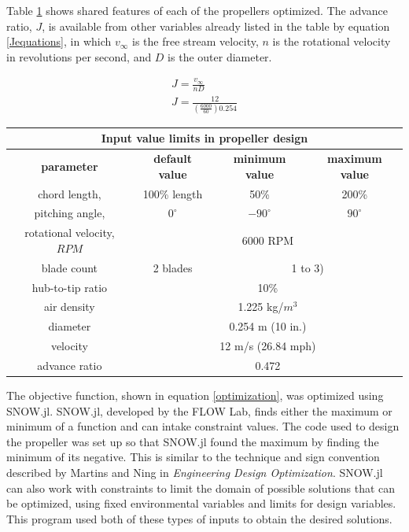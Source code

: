 \documentclass[journal ]{new-aiaa}
\begin{document}
Table \ref{constraintstab} shows shared features of each of the propellers optimized. The advance ratio, $J$, is available from other variables already listed in the table by equation \ref{Jequations}, in which $v_{\infty}$ is the free stream velocity, $n$ is the rotational velocity in revolutions per second, and $D$ is the outer diameter.

\begin{equation}
	\begin{aligned}
	\label{Jequations}
	J = \frac{v_{\infty}}{n D} \\
	J = \frac{12}{(\frac{6000}{60}) 0.254}
	\end{aligned}
\end{equation}

\begin{table}[H]
\label{constraintstab}
\centering
\begin{tabular}{| c | c | c | c |}
	\multicolumn{4}{c}{Input value limits in propeller design} \\ \hline
  	 \textbf{parameter} & \textbf{default value} & \textbf{minimum value} & \textbf{maximum value} \\ \hline
	 chord length, & 100\% length & 50\% & 200\% \\ \hline
	 pitching angle, & $0^{\circ}$ & $-90^{\circ}$ & $90^{\circ}$ \\ \hline \hline
	 rotational velocity, $RPM$ & \multicolumn{3}{c|}{6000 RPM} \\ \hline
	 blade count & 2 blades & \multicolumn{2}{c|}{1 to 3)}\\ \hline
	 hub-to-tip ratio & \multicolumn{3}{c|}{10\%} \\ \hline
	 air density & \multicolumn{3}{c|}{1.225 kg/$m^{3}$} \\ \hline
	 diameter & \multicolumn{3}{c|}{0.254 m (10 in.)} \\ \hline
	 velocity & \multicolumn{3}{c|}{12 m/s (26.84 mph)} \\ \hline
	 advance ratio & \multicolumn{3}{c|}{0.472} \\ \hline
\end{tabular}
\end{table}

The objective function, shown in equation \ref{optimization}, was optimized using SNOW.jl. SNOW.jl, developed by the FLOW Lab, finds either the maximum or minimum of a function and can intake constraint values. The code used to design the propeller was set up so that SNOW.jl found the maximum by finding the minimum of its negative. This is similar to the technique and sign convention described by Martins and Ning in \emph{Engineering Design Optimization}\cite{EngDesOpt}. SNOW.jl can also work with constraints to limit the domain of possible solutions that can be optimized, using fixed environmental variables and limits for design variables. This program used both of these types of inputs to obtain the desired solutions.
\end{document}
